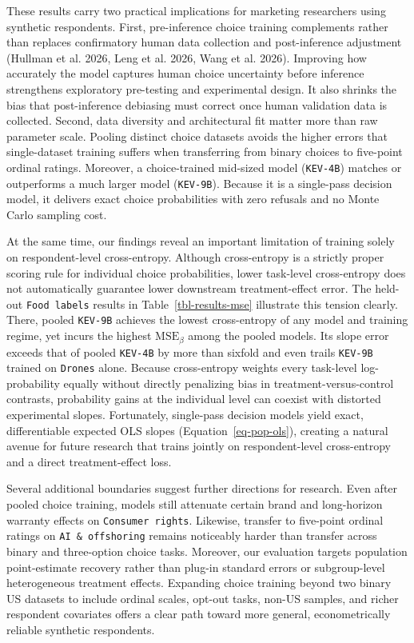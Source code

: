 \documentclass[
  11pt,
  letterpaper,
]{article}
\begin{document}
These results carry two practical implications for marketing researchers
using synthetic respondents. First, pre-inference choice training
complements rather than replaces confirmatory human data collection and
post-inference adjustment (Hullman et al. 2026, Leng et al. 2026, Wang
et al. 2026). Improving how accurately the model captures human choice
uncertainty before inference strengthens exploratory pre-testing and
experimental design. It also shrinks the bias that post-inference
debiasing must correct once human validation data is collected. Second,
data diversity and architectural fit matter more than raw parameter
scale. Pooling distinct choice datasets avoids the higher errors that
single-dataset training suffers when transferring from binary choices to
five-point ordinal ratings. Moreover, a choice-trained mid-sized model
(\texttt{KEV-4B}) matches or outperforms a much larger model
(\texttt{KEV-9B}). Because it is a single-pass decision model, it
delivers exact choice probabilities with zero refusals and no Monte
Carlo sampling cost.

At the same time, our findings reveal an important limitation of
training solely on respondent-level cross-entropy. Although
cross-entropy is a strictly proper scoring rule for individual choice
probabilities, lower task-level cross-entropy does not automatically
guarantee lower downstream treatment-effect error. The held-out
\texttt{Food\ labels} results in Table~\ref{tbl-results-mse} illustrate
this tension clearly. There, pooled \texttt{KEV-9B} achieves the lowest
cross-entropy of any model and training regime, yet incurs the highest
\(\mathrm{MSE}_\beta\) among the pooled models. Its slope error exceeds
that of pooled \texttt{KEV-4B} by more than sixfold and even trails
\texttt{KEV-9B} trained on \texttt{Drones} alone. Because cross-entropy
weights every task-level log-probability equally without directly
penalizing bias in treatment-versus-control contrasts, probability gains
at the individual level can coexist with distorted experimental slopes.
Fortunately, single-pass decision models yield exact, differentiable
expected OLS slopes (Equation~\ref{eq-pop-ols}), creating a natural
avenue for future research that trains jointly on respondent-level
cross-entropy and a direct treatment-effect loss.

Several additional boundaries suggest further directions for research.
Even after pooled choice training, models still attenuate certain brand
and long-horizon warranty effects on \texttt{Consumer\ rights}.
Likewise, transfer to five-point ordinal ratings on
\texttt{AI\ \&\ offshoring} remains noticeably harder than transfer
across binary and three-option choice tasks. Moreover, our evaluation
targets population point-estimate recovery rather than plug-in standard
errors or subgroup-level heterogeneous treatment effects. Expanding
choice training beyond two binary US datasets to include ordinal scales,
opt-out tasks, non-US samples, and richer respondent covariates offers a
clear path toward more general, econometrically reliable synthetic
respondents.
\end{document}
